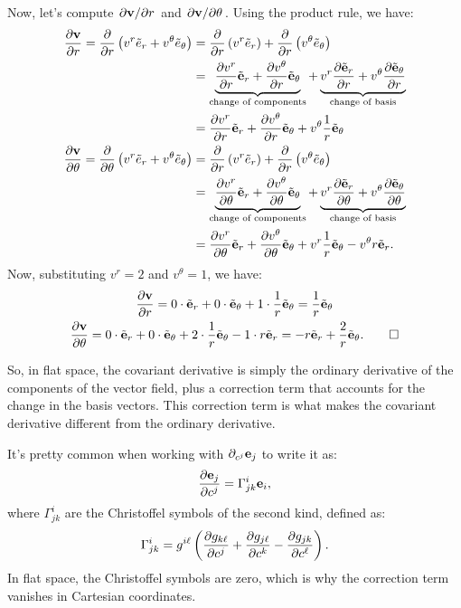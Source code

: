 \begin{example}
  Now, let's compute $\pdv{\mathbf{v}}/{r}$ and $\pdv{\mathbf{v}}/{\theta}$. Using the product rule, we have:
  \begin{align*}
    \pdv{\mathbf{v}}{r} = \pdv{}{r}\left(v^r\tilde{e}_r + v^\theta\tilde{e}_\theta\right) &= \pdv{}{r}\left(v^r\tilde{e}_r\right) + \pdv{}{r}\left(v^\theta\tilde{e}_\theta\right) \\
                                                                                  &= \underbrace{\pdv{v^r}{r} \tilde{\mathbf{e}}_r + \pdv{v^\theta}{r} \tilde{\mathbf{e}}_\theta}_{\text{change of components}} + \underbrace{v^r\pdv{\tilde{\mathbf{e}}_r}{r} + v^\theta\pdv{\tilde{\mathbf{e}}_\theta}{r}}_{\text{change of basis}} \\
                                                                                  &= \pdv{v^r}{r} \tilde{\mathbf{e}}_r + \pdv{v^\theta}{r} \tilde{\mathbf{e}}_\theta + v^\theta \frac{1}{r}\tilde{\mathbf{e}}_\theta \\
    \pdv{\mathbf{v}}{\theta} = \pdv{}{\theta}\left(v^r\tilde{e}_r + v^\theta\tilde{e}_\theta\right) &= \pdv{}{r}\left(v^r\tilde{e}_r\right) + \pdv{}{r}\left(v^\theta\tilde{e}_\theta\right) \\
                                                                                        &= \underbrace{\pdv{v^r}{\theta} \tilde{\mathbf{e}}_r + \pdv{v^\theta}{\theta} \tilde{\mathbf{e}}_\theta}_{\text{change of components}} + \underbrace{v^r\pdv{\tilde{\mathbf{e}}_r}{\theta} + v^\theta\pdv{\tilde{\mathbf{e}}_\theta}{\theta}}_{\text{change of basis}} \\
                                                                                        &= \pdv{v^r}{\theta} \tilde{\mathbf{e}}_r + \pdv{v^\theta}{\theta} \tilde{\mathbf{e}}_\theta + v^r \frac{1}{r}\tilde{\mathbf{e}}_\theta - v^\theta r \tilde{\mathbf{e}}_r
  .\end{align*}
  Now, substituting $v^r = 2$ and $v^\theta = 1$, we have:
  \begin{gather*}
    \pdv{\mathbf{v}}{r} = 0 \cdot \tilde{\mathbf{e}}_r + 0 \cdot \tilde{\mathbf{e}}_\theta + 1 \cdot \frac{1}{r}\tilde{\mathbf{e}}_\theta = \frac{1}{r}\tilde{\mathbf{e}}_\theta \\
    \pdv{\mathbf{v}}{\theta} = 0 \cdot \tilde{\mathbf{e}}_r + 0 \cdot \tilde{\mathbf{e}}_\theta + 2 \cdot \frac{1}{r}\tilde{\mathbf{e}}_\theta - 1 \cdot r \tilde{\mathbf{e}}_r = -r\tilde{\mathbf{e}}_r + \frac{2}{r}\tilde{\mathbf{e}}_\theta
  .\qedhere\end{gather*}
\end{example}

So, in flat space, the covariant derivative is simply the ordinary derivative of the components of the vector field, plus a correction term that accounts for the change in the basis vectors. This correction term is what makes the covariant derivative different from the ordinary derivative.

\begin{note}
  It's pretty common when working with $\pd{c^j}\e_j$ to write it as:
  \[%
    \pdv{\e_j}{c^j} = \Gamma^i_{jk}\e_i
  ,\]%
  where $\Gamma^i_{jk}$ are the Christoffel symbols of the second kind, defined as:
  \[%
    \Gamma^i_{jk} = g^{i\ell}\left(\pdv{g_{k\ell}}{c^j} + \pdv{g_{j\ell}}{c^k} - \pdv{g_{jk}}{c^\ell}\right)
  .\]%
  In flat space, the Christoffel symbols are zero, which is why the correction term vanishes in Cartesian coordinates.
\end{note}
